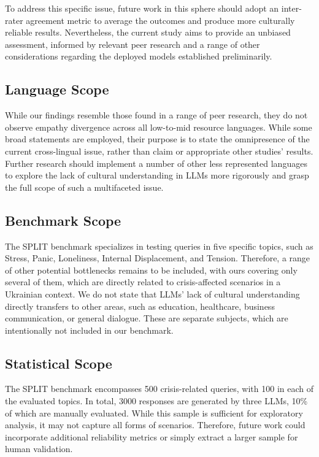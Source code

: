 \documentclass[10pt, twocolumn]{article}
\begin{document}
To address this specific issue, future work in this sphere should adopt an inter-rater agreement metric to average the outcomes and produce more culturally reliable results. Nevertheless, the current study aims to provide an unbiased assessment, informed by  relevant peer research and a range of other considerations regarding the deployed models established preliminarily.

\subsection{Language Scope}

While our findings resemble those found in a range of peer research, they do not observe empathy divergence across all low-to-mid resource languages. While some broad statements are employed, their purpose is to state the omnipresence of the current cross-lingual issue, rather than claim or appropriate other studies' results. Further research should implement a number of other less represented languages to explore the lack of cultural understanding in LLMs more rigorously and grasp the full scope of such a multifaceted issue.

\subsection{Benchmark Scope}

The SPLIT benchmark specializes in testing queries in five specific topics, such as Stress, Panic, Loneliness, Internal Displacement, and Tension. Therefore, a range of other potential bottlenecks remains to be included, with ours covering only several of them, which are directly related to crisis-affected scenarios in a Ukrainian context. We do not state that LLMs' lack of cultural understanding directly transfers to other areas, such as education, healthcare, business communication, or general dialogue. These are separate subjects, which are intentionally not included in our benchmark.

\subsection{Statistical Scope}

The SPLIT benchmark encompasses 500 crisis-related queries, with 100 in each of the evaluated topics. In total, 3000 responses are generated by three LLMs, 10\% of which are manually evaluated. While this sample is sufficient for exploratory analysis, it may not capture all forms of scenarios. Therefore, future work could incorporate additional reliability metrics or simply extract a larger sample for human validation.
\end{document}
